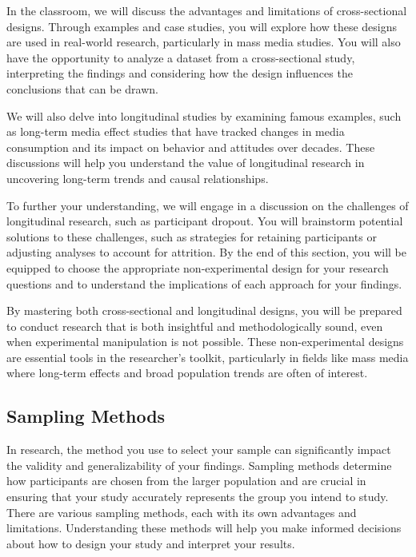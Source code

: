 \documentclass[
]{book}
\begin{document}
In the classroom, we will discuss the advantages and limitations of cross-sectional designs. Through examples and case studies, you will explore how these designs are used in real-world research, particularly in mass media studies. You will also have the opportunity to analyze a dataset from a cross-sectional study, interpreting the findings and considering how the design influences the conclusions that can be drawn.

We will also delve into longitudinal studies by examining famous examples, such as long-term media effect studies that have tracked changes in media consumption and its impact on behavior and attitudes over decades. These discussions will help you understand the value of longitudinal research in uncovering long-term trends and causal relationships.

To further your understanding, we will engage in a discussion on the challenges of longitudinal research, such as participant dropout. You will brainstorm potential solutions to these challenges, such as strategies for retaining participants or adjusting analyses to account for attrition. By the end of this section, you will be equipped to choose the appropriate non-experimental design for your research questions and to understand the implications of each approach for your findings.

By mastering both cross-sectional and longitudinal designs, you will be prepared to conduct research that is both insightful and methodologically sound, even when experimental manipulation is not possible. These non-experimental designs are essential tools in the researcher's toolkit, particularly in fields like mass media where long-term effects and broad population trends are often of interest.

\subsection{Sampling Methods}\label{sampling-methods}

In research, the method you use to select your sample can significantly impact the validity and generalizability of your findings. Sampling methods determine how participants are chosen from the larger population and are crucial in ensuring that your study accurately represents the group you intend to study. There are various sampling methods, each with its own advantages and limitations. Understanding these methods will help you make informed decisions about how to design your study and interpret your results.
\end{document}
